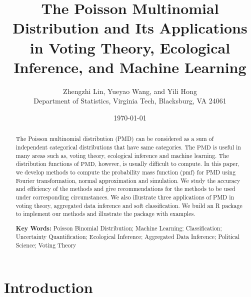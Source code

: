 \documentclass[12pt]{article}
\newcommand{\PMD}{\textrm{PMD}}
\begin{document}


\title{The Poisson Multinomial Distribution and Its Applications in Voting Theory, Ecological Inference, and Machine Learning}


\author{
Zhengzhi Lin, Yueyao Wang, and Yili Hong\\[1.5ex]
{Department of Statistics, Virginia Tech, Blacksburg, VA 24061}
}
	
\date{\today}
	
\maketitle
\begin{abstract}
The Poisson multinomial distribution (PMD) can be considered as a sum of independent categorical distributions that have same categories. The $\PMD$ is useful in many areas such as, voting theory, ecological inference and machine learning. The distribution functions of $\PMD$, however, is usually difficult to compute. In this paper, we develop methods to compute the probability mass function (pmf) for PMD using Fourier transformation, normal approximation and simulation. We study the accuracy and efficiency of the methods and give recommendations for the methods to be used under corresponding circumstances. We also illustrate three applications of PMD in voting theory, aggregated data inference and soft classification. We build an R package to implement our methods and illustrate the package with examples.

\textbf{Key Words:} Poisson Binomial Distribution; Machine Learning; Classification; Uncertainty Quantification; Ecological Inference;  Aggregated Data Inference; Political Science;  Voting Theory
\end{abstract}
	
\newpage
	
\section{Introduction}
\end{document}
